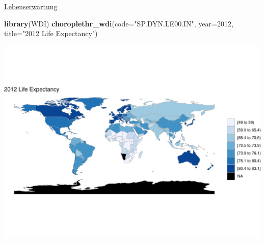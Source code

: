 \documentclass[ignorenonframetext,]{beamer}
\newenvironment{Shaded}{\begin{snugshade}}{\end{snugshade}}
\newcommand{\KeywordTok}[1]{\textcolor[rgb]{0.13,0.29,0.53}{\textbf{#1}}}
\newcommand{\DataTypeTok}[1]{\textcolor[rgb]{0.13,0.29,0.53}{#1}}
\newcommand{\DecValTok}[1]{\textcolor[rgb]{0.00,0.00,0.81}{#1}}
\newcommand{\StringTok}[1]{\textcolor[rgb]{0.31,0.60,0.02}{#1}}
\newcommand{\NormalTok}[1]{#1}
\begin{document}
\begin{frame}[fragile]{\href{http://mirrors.softliste.de/cran/web/packages/choroplethr/vignettes/f-world-bank-data.html}{Lebenserwartung}}

\begin{Shaded}
\begin{Highlighting}[]
\KeywordTok{library}\NormalTok{(WDI) }
\KeywordTok{choroplethr_wdi}\NormalTok{(}\DataTypeTok{code=}\StringTok{"SP.DYN.LE00.IN"}\NormalTok{, }\DataTypeTok{year=}\DecValTok{2012}\NormalTok{,}
                \DataTypeTok{title=}\StringTok{"2012 Life Expectancy"}\NormalTok{)}
\end{Highlighting}
\end{Shaded}

\includegraphics{Choroplethen_files/figure-beamer/unnamed-chunk-27-1.pdf}

\end{frame}
\end{document}
